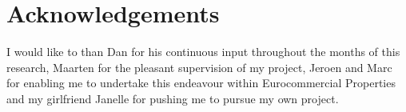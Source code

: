 \section{Acknowledgements}
\label{section:acknowledgements}
I would like to than Dan for his continuous input throughout the months of this research, Maarten for the pleasant supervision of my project, Jeroen and Marc for enabling me to undertake this endeavour within Eurocommercial Properties and my girlfriend Janelle for pushing me to pursue my own project.